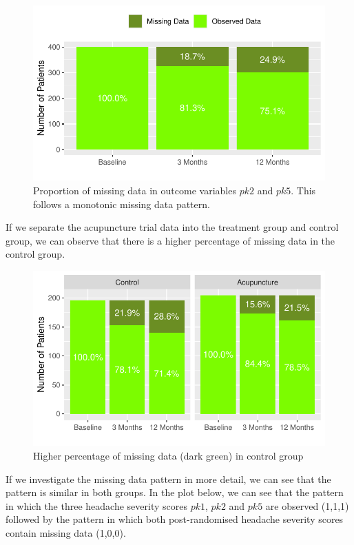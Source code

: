 \documentclass{article}
\newcommand{\pandocbounded}[1]{#1}
\begin{document}
\begin{figure}
\centering
\pandocbounded{\includegraphics[keepaspectratio]{Final_Report_files/figure-latex/unnamed-chunk-18-1.pdf}}
\caption{Proportion of missing data in outcome variables \(pk2\) and
\(pk5\). This follows a monotonic missing data pattern.}
\end{figure}

If we separate the acupuncture trial data into the treatment group and
control group, we can observe that there is a higher percentage of
missing data in the control group.

\begin{figure}
\centering
\pandocbounded{\includegraphics[keepaspectratio]{Final_Report_files/figure-latex/unnamed-chunk-19-1.pdf}}
\caption{Higher percentage of missing data (dark green) in control
group}
\end{figure}

If we investigate the missing data pattern in more detail, we can see
that the pattern is similar in both groups. In the plot below, we can
see that the pattern in which the three headache severity scores
\(pk1\), \(pk2\) and \(pk5\) are observed (1,1,1) followed by the
pattern in which both post-randomised headache severity scores contain
missing data (1,0,0).
\end{document}
